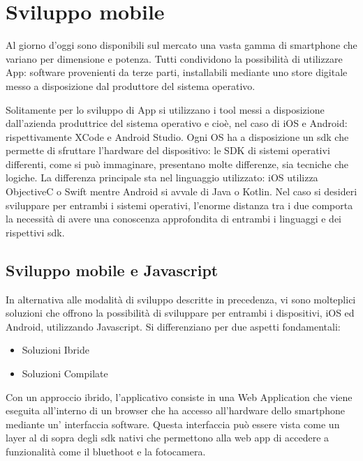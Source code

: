 \section{Sviluppo mobile}\vspace{5mm}

Al giorno d'oggi sono disponibili sul mercato una vasta gamma di smartphone che variano per dimensione e potenza. Tutti condividono la possibilità di utilizzare App: software provenienti da terze parti, installabili mediante uno store digitale messo a disposizione dal produttore del sistema operativo.\vspace{5mm}

Solitamente per lo sviluppo di App si utilizzano i tool messi a disposizione dall'azienda produttrice del sistema operativo e cioè, nel caso di iOS e Android: rispettivamente XCode e Android Studio. Ogni OS ha a disposizione un sdk che permette di sfruttare l'hardware del dispositivo: le SDK di sistemi operativi differenti, come si può immaginare, presentano molte differenze, sia tecniche che logiche. La differenza principale sta nel linguaggio utilizzato: iOS utilizza ObjectiveC o Swift mentre Android si avvale di Java o Kotlin. Nel caso si desideri sviluppare per entrambi i sistemi operativi, l'enorme distanza tra i due comporta la necessità di avere una conoscenza approfondita di entrambi i linguaggi e dei rispettivi sdk.\vspace{5mm}

\subsection{Sviluppo mobile e Javascript}\vspace{5mm}

In alternativa alle modalità di sviluppo descritte in precedenza, vi sono molteplici soluzioni che offrono la possibilità di sviluppare per entrambi i dispositivi, iOS ed Android, utilizzando Javascript. Si differenziano per due aspetti fondamentali:
\begin{itemize}
\item Soluzioni Ibride
\item Soluzioni Compilate
\end{itemize}

Con un approccio ibrido, l'applicativo consiste in una Web Application che viene eseguita all'interno di un browser che ha accesso all'hardware dello smartphone mediante un' interfaccia software. Questa interfaccia può essere vista come un layer al di sopra degli sdk nativi che permettono alla web app di accedere a funzionalità come il bluethoot e la fotocamera.\vspace{5mm}

